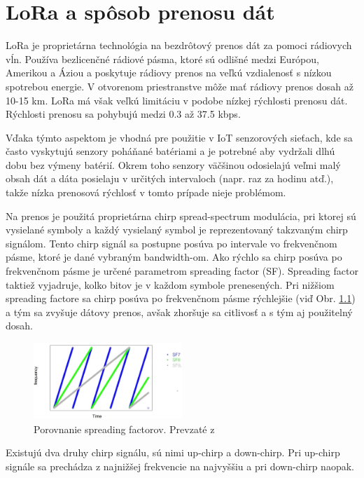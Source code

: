 \documentclass[slovak,master]{diploma}
\begin{document}
\chapter{LoRa a spôsob prenosu dát}
LoRa je proprietárna technológia na bezdrôtový prenos dát za pomoci rádiovych vĺn.
Používa bezlicenčné rádiové pásma, ktoré sú odlišné medzi Európou, Amerikou a Áziou a poskytuje rádiovy prenos na veľkú vzdialenosť s nízkou spotrebou energie.
V otvorenom priestranstve môže mať rádiovy prenos dosah až 10-15 km. LoRa má však veľkú limitáciu v podobe nízkej rýchlosti prenosu dát.
Rýchlosti prenosu sa pohybujú medzi 0.3 až 37.5 kbps.

Vďaka týmto aspektom je vhodná pre použitie v IoT senzorových sieťach, kde sa často vyskytujú senzory poháňané batériami a je potrebné aby vydržali dlhú dobu 
bez výmeny batérií. Okrem toho senzory väčšinou odosielajú veľmi malý obsah dát a dáta posielaju v určitých intervaloch (napr. raz za hodinu atď.), 
takže nízka prenosová rýchlosť v tomto prípade nieje problémom.

Na prenos je použitá proprietárna chirp spread-spectrum modulácia, pri ktorej sú 
vysielané symboly a každý vysielaný symbol je reprezentovaný takzvaným chirp signálom. Tento chirp signál sa postupne posúva po intervale 
vo frekvenčnom pásme, ktoré je dané vybraným bandwidth-om. 
Ako rýchlo sa chirp posúva po frekvenčnom pásme je určené parametrom spreading factor (SF). Spreading factor taktiež vyjadruje, kolko bitov je v každom 
symbole prenesených. Pri nižšiom spreading factore sa chirp posúva po frekvenčnom pásme rýchlejšie (viď Obr. \ref{fig:spreadingfactors}) a tým sa zvyšuje dátovy prenos, 
avšak zhoršuje sa citlivosť a s tým aj použitelný dosah.

\begin{figure}
	\centering
	\includegraphics[width=0.5\textwidth]{Figures/spreading factors.png}
	\caption{Porovnanie spreading factorov. Prevzaté z \cite{spreadfactorimage}}
	\label{fig:spreadingfactors}
\end{figure}
\newpage

Existujú dva druhy chirp signálu, sú nimi up-chirp a down-chirp. Pri up-chirp signále sa prechádza z najnižšej frekvencie na najvyššiu a pri 
down-chirp naopak.
\end{document}
